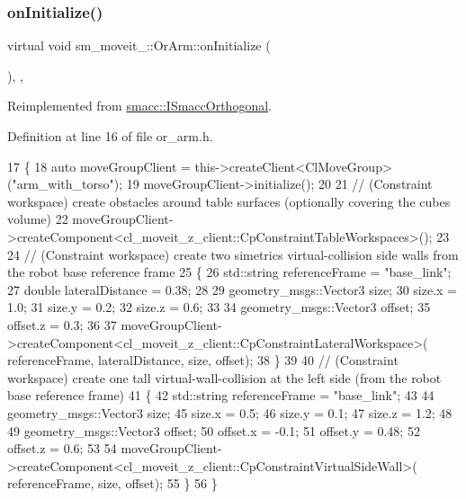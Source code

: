 \subsubsection{\texorpdfstring{on\+Initialize()}{onInitialize()}}
{\footnotesize\ttfamily virtual void sm\+\_\+moveit\+\_\+::\+Or\+Arm\+::on\+Initialize (\begin{DoxyParamCaption}{ }\end{DoxyParamCaption})\hspace{0.3cm}{\ttfamily [inline]}, {\ttfamily [override]}, {\ttfamily [virtual]}}



Reimplemented from \hyperlink{classsmacc_1_1ISmaccOrthogonal_a6bb31c620cb64dd7b8417f8705c79c7a}{smacc\+::\+I\+Smacc\+Orthogonal}.



Definition at line 16 of file or\+\_\+arm.\+h.


\begin{DoxyCode}
17         \{
18             \textcolor{keyword}{auto} moveGroupClient = this->createClient<ClMoveGroup>(\textcolor{stringliteral}{"arm\_with\_torso"});
19             moveGroupClient->initialize();
20 
21             \textcolor{comment}{// (Constraint workspace) create obstacles around table surfaces (optionally covering the cubes
       volume)}
22             moveGroupClient->createComponent<cl\_moveit\_z\_client::CpConstraintTableWorkspaces>();
23 
24             \textcolor{comment}{// (Constraint workspace) create two simetrics virtual-collision side walls from the robot base
       reference frame}
25             \{
26                 std::string referenceFrame = \textcolor{stringliteral}{"base\_link"};
27                 \textcolor{keywordtype}{double} lateralDistance = 0.38;
28 
29                 geometry\_msgs::Vector3 size;
30                 size.x = 1.0;
31                 size.y = 0.2;
32                 size.z = 0.6;
33 
34                 geometry\_msgs::Vector3 offset;
35                 offset.z = 0.3;
36 
37                 moveGroupClient->createComponent<cl\_moveit\_z\_client::CpConstraintLateralWorkspace>(
      referenceFrame, lateralDistance, size, offset);
38             \}
39 
40             \textcolor{comment}{// (Constraint workspace) create one tall virtual-wall-collision at the left side (from the
       robot base reference frame)}
41             \{
42                 std::string referenceFrame = \textcolor{stringliteral}{"base\_link"};
43 
44                 geometry\_msgs::Vector3 size;
45                 size.x = 0.5;
46                 size.y = 0.1;
47                 size.z = 1.2;
48 
49                 geometry\_msgs::Vector3 offset;
50                 offset.x = -0.1;
51                 offset.y = 0.48;
52                 offset.z = 0.6;
53 
54                 moveGroupClient->createComponent<cl\_moveit\_z\_client::CpConstraintVirtualSideWall>(
      referenceFrame, size, offset);
55             \}
56         \}
\end{DoxyCode}


